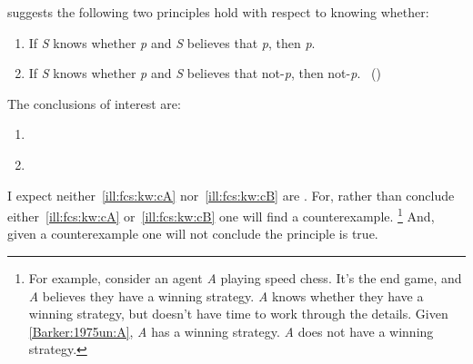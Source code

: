 \begin{note}
  \begin{scenario}%
    \label{ill:fcs:kw}%
    \citeauthor{Barker:1975un} suggests the following two principles hold with respect to knowing whether:

    \begin{enumerate}[label=(\Alph*), ref=(\Alph*)]
    \item
      \label{Barker:1975un:A}
      If \emph{S} knows whether \emph{p} and \emph{S} believes that \emph{p}, then \emph{p}.
    \item
      \label{Barker:1975un:B}
      If \emph{S} knows whether \emph{p} and \emph{S} believes that not-\emph{p}, then not-\emph{p}.%
      \mbox{ }\hfill\mbox{(\citeyear[281]{Barker:1975un})}
    \end{enumerate}
  \end{scenario}

  \noindent The conclusions of interest are:

  \begin{enumerate}[label=C\Alph*., ref=(C\Alph*)]
  \item
    \label{ill:fcs:kw:cA}
  \item
    \label{ill:fcs:kw:cB}
  \end{enumerate}

  \noindent I expect neither~\ref{ill:fcs:kw:cA} nor~\ref{ill:fcs:kw:cB} are .
  For, rather than conclude either~\ref{ill:fcs:kw:cA} or~\ref{ill:fcs:kw:cB} one will find a counterexample.%
  \footnote{
    For example, consider an agent \emph{A} playing speed chess.
    It's the end game, and \emph{A} believes they have a winning strategy.
    \emph{A} knows whether they have a winning strategy, but doesn't have time to work through the details.
    Given \ref{Barker:1975un:A}, \emph{A} has a winning strategy.
    \emph{A} does not have a winning strategy.
  }
  And, given a counterexample one will not conclude the principle is true.
\end{note}


